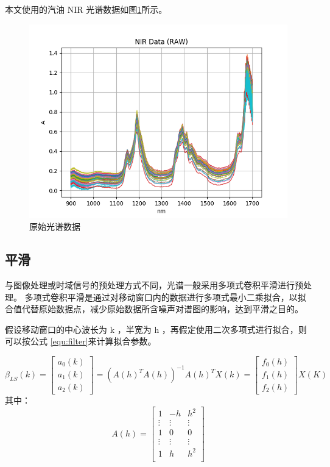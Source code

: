 \documentclass[a4paper]{article}
\begin{document}
		本文使用的汽油 NIR 光谱数据如图\ref{fig:nir-data-raw}所示。
		
		\begin{figure}[h]
			\centering
			\includegraphics[width=\linewidth]{../img/raw}
			\caption{原始光谱数据}
			\label{fig:nir-data-raw}
		\end{figure}
	
		\subsection{平滑}\label{section:filter}
			与图像处理或时域信号的预处理方式不同，光谱一般采用多项式卷积平滑进行预处理。
			多项式卷积平滑是通过对移动窗口内的数据进行多项式最小二乘拟合，以拟合值代替原始数据点，减少原始数据所含噪声对谱图的影响，达到平滑之目的。
			
			假设移动窗口的中心波长为 k ，半宽为 h ，再假定使用二次多项式进行拟合，则可以按公式 \eqref{equ:filter}来计算拟合参数。
			
			\begin{equation}\label{equ:filter}
				\beta_{LS}(k) = 
				\begin{bmatrix}
					a_0(k) \\ a_1(k) \\ a_2(k)
				\end{bmatrix}
				= \left( A(h)^TA(h) \right)^{-1}A(h)^TX(k) = 
				\begin{bmatrix}
					f_0(h) \\ f_1(h) \\ f_2(h)
				\end{bmatrix} 
				X(K)
			\end{equation}
			其中：
			\[
				A(h) =
				\begin{bmatrix}
					1 & -h & h^2 \\
					\vdots & \vdots & \vdots \\
					1 & 0 & 0 \\
					\vdots & \vdots & \vdots \\
					1 & h & h^2 \\
				\end{bmatrix} 
			\]
			
\end{document}
